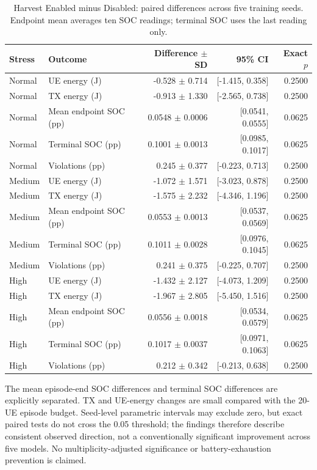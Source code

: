 \documentclass[conference]{IEEEtran}
\begin{document}
\begin{table}[t]
\centering\footnotesize
\caption{Harvest Enabled minus Disabled: paired differences across five training seeds. Endpoint mean averages ten SOC readings; terminal SOC uses the last reading only.}
\label{tab:ehdiff}
\begin{tabular}{@{}llrrr@{}}\toprule
Stress & Outcome & Difference $\pm$ SD & 95\% CI & Exact $p$\\\midrule
Normal & UE energy (J) & -0.528 $\pm$ 0.714 & [-1.415, 0.358] & 0.2500 \\
Normal & TX energy (J) & -0.913 $\pm$ 1.330 & [-2.565, 0.738] & 0.2500 \\
Normal & Mean endpoint SOC (pp) & 0.0548 $\pm$ 0.0006 & [0.0541, 0.0555] & 0.0625 \\
Normal & Terminal SOC (pp) & 0.1001 $\pm$ 0.0013 & [0.0985, 0.1017] & 0.0625 \\
Normal & Violations (pp) & 0.245 $\pm$ 0.377 & [-0.223, 0.713] & 0.2500 \\
Medium & UE energy (J) & -1.072 $\pm$ 1.571 & [-3.023, 0.878] & 0.2500 \\
Medium & TX energy (J) & -1.575 $\pm$ 2.232 & [-4.346, 1.196] & 0.2500 \\
Medium & Mean endpoint SOC (pp) & 0.0553 $\pm$ 0.0013 & [0.0537, 0.0569] & 0.0625 \\
Medium & Terminal SOC (pp) & 0.1011 $\pm$ 0.0028 & [0.0976, 0.1045] & 0.0625 \\
Medium & Violations (pp) & 0.241 $\pm$ 0.375 & [-0.225, 0.707] & 0.2500 \\
High & UE energy (J) & -1.432 $\pm$ 2.127 & [-4.073, 1.209] & 0.2500 \\
High & TX energy (J) & -1.967 $\pm$ 2.805 & [-5.450, 1.516] & 0.2500 \\
High & Mean endpoint SOC (pp) & 0.0556 $\pm$ 0.0018 & [0.0534, 0.0579] & 0.0625 \\
High & Terminal SOC (pp) & 0.1017 $\pm$ 0.0037 & [0.0971, 0.1063] & 0.0625 \\
High & Violations (pp) & 0.212 $\pm$ 0.342 & [-0.213, 0.638] & 0.2500 \\
\bottomrule\end{tabular}
\end{table}

The mean episode-end SOC differences and terminal SOC differences are explicitly separated. TX and UE-energy changes are small compared with the 20-UE episode budget. Seed-level parametric intervals may exclude zero, but exact paired tests do not cross the 0.05 threshold; the findings therefore describe consistent observed direction, not a conventionally significant improvement across five models. No multiplicity-adjusted significance or battery-exhaustion prevention is claimed.
\end{document}

